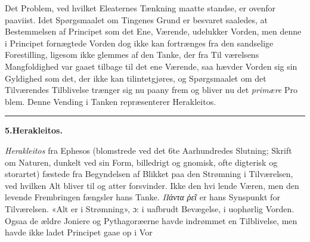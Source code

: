\documentclass[12pt,a4paper]{book}
\newcommand{\divrule}{\begin{center}\rule{2cm}{0.4pt}\end{center}}
\newcommand{\gk}[1]{\textit{#1}}
\begin{document}
Det Problem, ved hvilket Eleaternes Tænkning maatte
standse, er ovenfor paaviist. Idet Spørgsmaalet om Tingenes
Grund er besvaret saaledes, at Bestemmelsen af Principet som
det Ene, Værende, udelukker Vorden, men denne i Principet
fornægtede Vorden dog ikke kan fortrænges fra den sandselige
Forestilling, ligesom ikke glemmes af den Tanke, der fra Til\-%
værelsens Mangfoldighed var gaaet tilbage til det ene Værende,
saa hævder Vorden sig sin Gyldighed som det, der ikke kan
tilintetgjøres, og Spørgsmaalet om det Tilværendes Tilblivelse
trænger sig nu paany frem og bliver nu det \emph{primære} Pro\-%
blem. Denne Vending i Tanken repræsenterer Herakleitos.
\divrule
\begin{center}
\textbf{5.\enspace Herakleitos.}
\end{center}
\emph{Herakleitos} fra Ephesos (blomstrede ved det 6te
Aarhundredes Slutning; Skrift om Naturen, dunkelt ved sin
Form, billedrigt og gnomisk, ofte digterisk og storartet) fæstede
fra Begyndelsen af Blikket paa den Strømning i Tilværelsen,
ved hvilken Alt bliver til og atter forsvinder. Ikke den hvi\-%
lende Væren, men den levende Frembringen fængsler hans
Tanke. \gk{Πάντα ῥεῖ} er hans Synspunkt for Tilværelsen. «Alt
er i Strømning», ɔ: i uafbrudt Bevægelse, i uophørlig Vorden.
Ogsaa de ældre Joniere og Pythagoræerne havde indrømmet
en Tilblivelse, men havde ikke ladet Principet gaae op i Vor\-%
\end{document}
